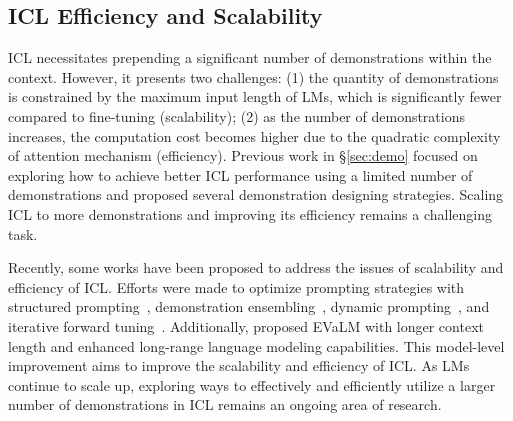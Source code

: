 \subsection{ICL Efficiency and Scalability}
ICL necessitates prepending a significant number of demonstrations within the context. However, it presents two challenges: (1) the quantity of demonstrations is constrained by the maximum input length of LMs, which is significantly fewer compared to fine-tuning (scalability); (2) as the number of demonstrations increases, the computation cost becomes higher due to the quadratic complexity of attention mechanism (efficiency). Previous work in \S\ref{sec:demo} focused on exploring how to achieve better ICL performance using a limited number of demonstrations and proposed several demonstration designing strategies. Scaling ICL to more demonstrations and improving its efficiency remains a challenging task.


Recently, some works have been proposed to address the issues of scalability and efficiency of ICL. Efforts were made to optimize prompting strategies with structured prompting~\citep{hao2022structured}, demonstration ensembling~\citep{khalifa2023exploring}, dynamic prompting~\citep{zhou2023efficient}, and iterative forward tuning~\citep{yang2023iterative}. Additionally, \citet{li2023context} proposed EVaLM with longer context length and enhanced long-range language modeling capabilities. This model-level improvement aims to improve the scalability and efficiency of ICL. As LMs continue to scale up, exploring ways to effectively and efficiently utilize a larger number of demonstrations in ICL remains an ongoing area of research.




